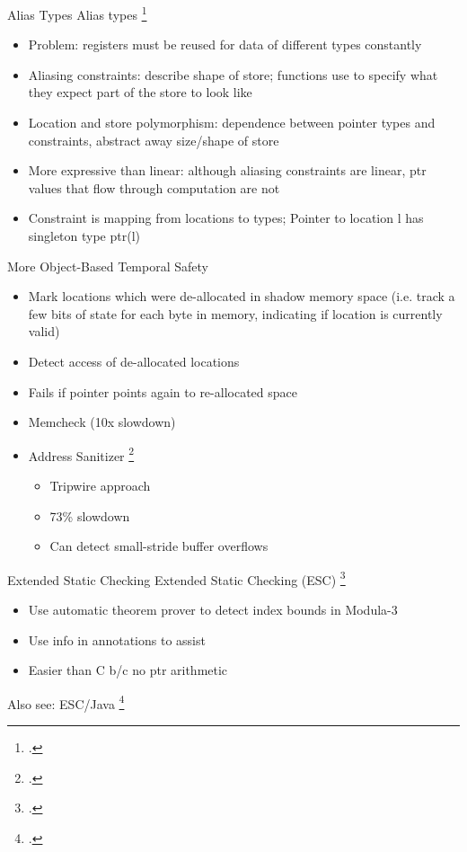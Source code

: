 \documentclass[aspectratio=169]{beamer}
\begin{document}
\begin{frame}{Alias Types}
  Alias types \footcite{smith_alias_2000}
    \begin{itemize}
        \item Problem: registers must be reused for data of different types constantly
        \item Aliasing constraints: describe shape of store; functions use to specify what they expect part of the store to look like
        \item Location and store polymorphism: dependence between pointer types and constraints, abstract away size/shape of store
        \item More expressive than linear: although aliasing constraints are linear, ptr values that flow through computation are not
        \item Constraint is mapping from locations to types; Pointer to location l has singleton type ptr(l)
    \end{itemize}
\end{frame}

\begin{frame}{More Object-Based Temporal Safety}
\begin{itemize}
\item Mark locations which were de-allocated in shadow memory space (i.e. track a few bits of state for each byte in memory, indicating if location is currently valid)
\item Detect access of de-allocated locations
\item Fails if pointer points again to re-allocated space
\item Memcheck (10x slowdown)
\item Address Sanitizer \footcite{serebryany_addresssanitizer:_2012}
    \begin{itemize}
        \item Tripwire approach
        \item 73\% slowdown
        \item Can detect small-stride buffer overflows
    \end{itemize}
\end{itemize}
\end{frame}

\begin{frame}{Extended Static Checking}
Extended Static Checking (ESC) \footcite{detlefs_overview_1995}
    \begin{itemize}
      \item Use automatic theorem prover to detect index bounds in Modula-3
      \item Use info in annotations to assist
      \item Easier than C b/c no ptr arithmetic
    \end{itemize}
Also see: ESC/Java \footcite{flanagan_extended_2002}
\end{frame}
\end{document}
